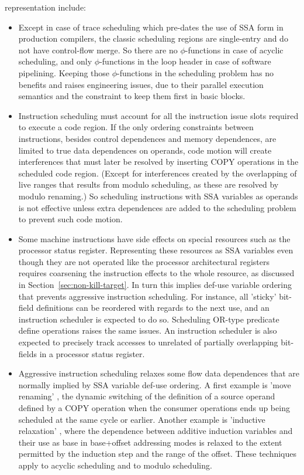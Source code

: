 representation include: \begin{itemize}

\item Except in case of trace scheduling which pre-dates the use of SSA form in
production compilers, the classic scheduling regions are single-entry and do not
have control-flow merge. So there are no $\phi$-functions in case of acyclic
scheduling, and only $\phi$-functions in the loop header in case of software
pipelining. Keeping those $\phi$-functions in the scheduling problem has no
benefits and raises engineering issues, due to their parallel execution
semantics and the constraint to keep them first in basic blocks.

\item Instruction scheduling must account for all the instruction issue slots
required to execute a code region. If the only ordering constraints between
instructions, besides control dependences and memory dependences, are limited to
true data dependences on operands, code motion will create interferences that
must later be resolved by inserting COPY operations in the scheduled code
region. (Except for interferences created by the overlapping of live ranges
that results from modulo scheduling, as these are resolved by modulo renaming.)
So scheduling instructions with SSA variables as operands is not effective
unless extra dependences are added to the scheduling problem to prevent such
code motion. 

\item Some machine instructions have side effects on special resources such as
the processor status register. Representing these resources as SSA variables
even though they are not operated like the processor architectural registers
requires coarsening the instruction effects to the whole resource, as discussed
in Section~\ref{sec:non-kill-target}. In turn this implies def-use variable
ordering that prevents aggressive instruction scheduling. For instance, all
'sticky' bit-field definitions can be reordered with regards to the next use,
and an instruction scheduler is expected to do so. Scheduling OR-type predicate
define operations \cite{Schlansker:1999:PLDI} raises the same issues. An
instruction scheduler is also expected to precisely track accesses to unrelated
of partially overlapping bit-fields in a processor status register.

\item Aggressive instruction scheduling relaxes some flow data dependences that
are normally implied by SSA variable def-use ordering. A first example is 'move
renaming' \cite{Young:1998:MICRO}, the dynamic switching of the definition of a
source operand defined by a COPY operation when the consumer operations ends
up being scheduled at the same cycle or earlier. Another example is 'inductive
relaxation' \cite{Dinechin:1997:PaCT}, where the dependence between additive
induction variables and their use as base in base+offset addressing modes is
relaxed to the extent permitted by the induction step and the range of the
offset. These techniques apply to acyclic scheduling and to modulo scheduling.

\end{itemize}

